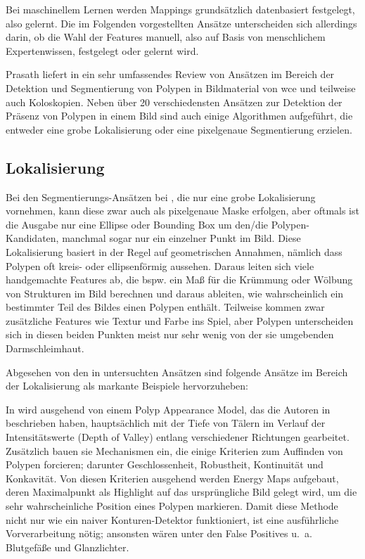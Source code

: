 Bei maschinellem Lernen werden Mappings grundsätzlich datenbasiert festgelegt, also gelernt.
Die im Folgenden vorgestellten Ansätze unterscheiden sich allerdings darin, ob die Wahl der Features manuell, also auf Basis von menschlichem Expertenwissen, festgelegt oder gelernt wird.

Prasath liefert in \cite{Prasath.2016} ein sehr umfassendes Review von Ansätzen im Bereich der Detektion und Segmentierung von Polypen in Bildmaterial von \gls{wce} und teilweise auch Koloskopien.
Neben über 20 verschiedensten Ansätzen zur Detektion der Präsenz von Polypen in einem Bild sind auch einige Algorithmen aufgeführt, die entweder eine grobe Lokalisierung oder eine pixelgenaue Segmentierung erzielen.

\subsection{Lokalisierung}

Bei den Segmentierungs-Ansätzen bei \cite{Prasath.2016}, die nur eine grobe Lokalisierung vornehmen, kann diese zwar auch als pixelgenaue Maske erfolgen, aber oftmals ist die Ausgabe nur eine Ellipse oder Bounding Box um den/die Polypen-Kandidaten, manchmal sogar nur ein einzelner Punkt im Bild.
Diese Lokalisierung basiert in der Regel auf geometrischen Annahmen, nämlich dass Polypen oft kreis- oder ellipsenförmig aussehen.
Daraus leiten sich viele handgemachte Features ab, die bspw. ein Maß für die Krümmung oder Wölbung von Strukturen im Bild berechnen und daraus ableiten, wie wahrscheinlich ein bestimmter Teil des Bildes einen Polypen enthält.
Teilweise kommen zwar zusätzliche Features wie Textur und Farbe ins Spiel, aber Polypen unterscheiden sich in diesen beiden Punkten meist nur sehr wenig von der sie umgebenden Darmschleimhaut.

Abgesehen von den in \cite{Prasath.2016} untersuchten Ansätzen sind folgende Ansätze im Bereich der Lokalisierung als markante Beispiele hervorzuheben:

In \cite{Bernal.2015} wird ausgehend von einem Polyp Appearance Model, das die Autoren in \cite{Bernal.2012} beschrieben haben, hauptsächlich mit der Tiefe von Tälern im Verlauf der Intensitätswerte (Depth of Valley) entlang verschiedener Richtungen gearbeitet.
Zusätzlich bauen sie Mechanismen ein, die einige Kriterien zum Auffinden von Polypen forcieren; darunter Geschlossenheit, Robustheit, Kontinuität und Konkavität.
Von diesen Kriterien ausgehend werden Energy Maps aufgebaut, deren Maximalpunkt als Highlight auf das ursprüngliche Bild gelegt wird, um die sehr wahrscheinliche Position eines Polypen markieren.
Damit diese Methode nicht nur wie ein naiver Konturen-Detektor funktioniert, ist eine ausführliche Vorverarbeitung nötig; ansonsten wären unter den False Positives u.~a. Blutgefäße und Glanzlichter.

